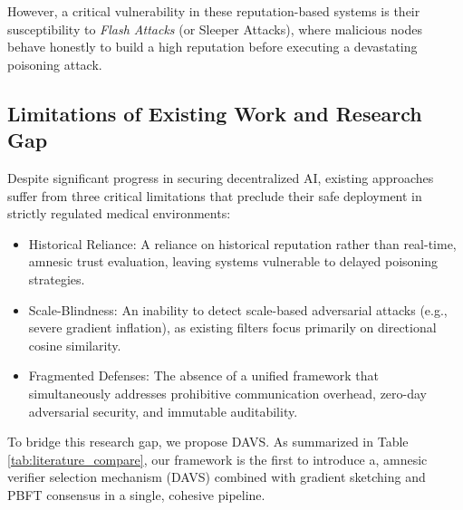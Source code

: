 \documentclass[conference]{IEEEtran}
\begin{document}
However, a critical vulnerability in these reputation-based systems is their susceptibility to \textit{Flash Attacks} (or Sleeper Attacks), where malicious nodes behave honestly to build a high reputation before executing a devastating poisoning attack. 

\subsection{Limitations of Existing Work and Research Gap}
Despite significant progress in securing decentralized AI, existing approaches suffer from three critical limitations that preclude their safe deployment in strictly regulated medical environments:

\begin{itemize}
    \item Historical Reliance: A reliance on historical reputation rather than real-time, amnesic trust evaluation, leaving systems vulnerable to delayed poisoning strategies.
    \item Scale-Blindness: An inability to detect scale-based adversarial attacks (e.g., severe gradient inflation), as existing filters focus primarily on directional cosine similarity.
    \item Fragmented Defenses: The absence of a unified framework that simultaneously addresses prohibitive communication overhead, zero-day adversarial security, and immutable auditability.
\end{itemize}

To bridge this research gap, we propose DAVS. As summarized in Table \ref{tab:literature_compare}, our framework is the first to introduce a, amnesic verifier selection mechanism (DAVS) combined with gradient sketching and PBFT consensus in a single, cohesive pipeline.
\end{document}
